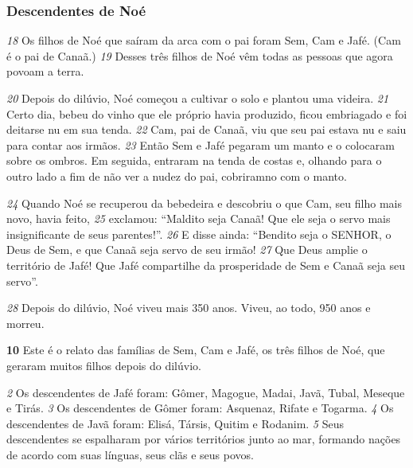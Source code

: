\bigskip
\subsubsection*{Descendentes de Noé}


\textit{\tiny 18}
 Os filhos de Noé que saíram da arca com o pai foram Sem, Cam e Jafé. (Cam é o pai de Canaã.) 
\textit{\tiny 19}
 Desses três filhos de Noé vêm todas as pessoas que agora povoam a terra.



\bigskip
\textit{\tiny 20}
 Depois do dilúvio, Noé começou a cultivar o solo e plantou uma videira. 
\textit{\tiny 21}
 Certo dia, bebeu do vinho que ele próprio havia produzido, ficou embriagado e foi deitarse nu em sua tenda. 
\textit{\tiny 22}
 Cam, pai de Canaã, viu que seu pai estava nu e saiu para contar aos irmãos. 
\textit{\tiny 23}
 Então Sem e Jafé pegaram um manto e o colocaram sobre os ombros. Em seguida, entraram na tenda de costas e, olhando para o outro lado a fim de não ver a nudez do pai, cobriramno com o manto.


\bigskip
\textit{\tiny 24}
 Quando Noé se recuperou da bebedeira e descobriu o que Cam, seu filho mais novo, havia feito, 
\textit{\tiny 25}
 exclamou: “Maldito seja Canaã! Que ele seja o servo mais insignificante de seus parentes!”. 
\textit{\tiny 26}
 E disse ainda: “Bendito seja o SENHOR, o Deus de Sem, e que Canaã seja servo de seu irmão! 
\textit{\tiny 27}
 Que Deus amplie o território de Jafé! Que Jafé compartilhe da prosperidade de Sem e Canaã seja seu servo”.


\bigskip
\textit{\tiny 28}
 Depois do dilúvio, Noé viveu mais 350 anos. Viveu, ao todo, 950 anos e morreu.


\bigskip
\textbf{\large 10}
 Este é o relato das famílias de Sem, Cam e Jafé, os três filhos de Noé, que geraram muitos filhos depois do dilúvio.


\bigskip
\textit{\tiny 2}
 Os descendentes de Jafé foram: Gômer, Magogue, Madai, Javã, Tubal, Meseque e Tirás. 
\textit{\tiny 3}
 Os descendentes de Gômer foram: Asquenaz, Rifate e Togarma. 
\textit{\tiny 4}
 Os descendentes de Javã foram: Elisá, Társis, Quitim e Rodanim. 
\textit{\tiny 5}
 Seus descendentes se espalharam por vários territórios junto ao mar, formando nações de acordo com suas línguas, seus clãs e seus povos.


